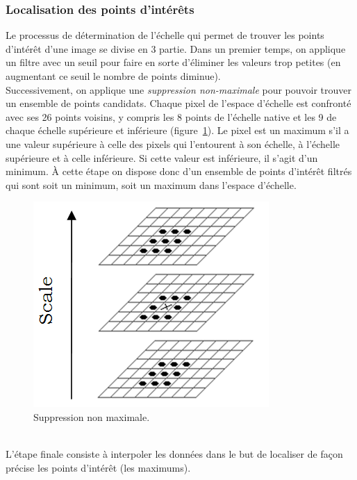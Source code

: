 \documentclass[a4paper,11pt]{report}
\begin{document}
\subsubsection{Localisation des points d'intérêts}
Le processus de détermination de l'échelle qui permet de trouver les points d'intérêt d'une image se divise en 3 partie. Dans un premier temps, on applique un filtre avec un seuil pour faire en sorte d'éliminer les valeurs trop petites (en augmentant ce seuil le nombre de points diminue).
\\Successivement, on applique une \textit{suppression non-maximale} pour pouvoir trouver un ensemble de points candidats. Chaque pixel de l'espace d'échelle est confronté avec ses 26 points voisins, y compris les 8 points de l'échelle native et les 9 de chaque échelle supérieure et inférieure (figure~\ref{fig6}). Le pixel est un maximum s'il a une valeur supérieure à celle des pixels qui l'entourent à son échelle, à l'échelle supérieure et à celle inférieure. Si cette valeur est inférieure, il s'agit d'un minimum. \`A cette étape on dispose donc d'un ensemble de points d'intérêt filtrés qui sont soit un minimum, soit un maximum dans l'espace d'échelle.
\begin{figure}[ht]
\centering
\includegraphics[scale=0.3]{figure6.png}
\caption{Suppression non maximale.}
\label{fig6}
\end{figure}
\\L'étape finale consiste à interpoler les données dans le but de localiser de façon précise les points d'intérêt (les maximums).
\end{document}
